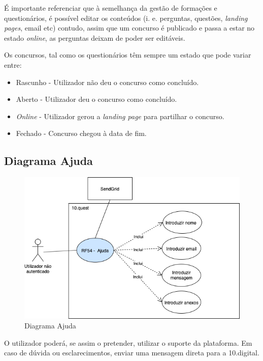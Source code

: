 É importante referenciar que à semelhança da gestão de formações e questionários, é possível editar os conteúdos (i. e. perguntas, questões, \textit{landing pages}, email etc) contudo, assim que um concurso é publicado e passa a estar no estado \textit{online}, as perguntas deixam de poder ser editáveis. 

Os concursos, tal como os questionários têm sempre um estado que pode variar entre:
\begin{itemize}
	\item Rascunho - Utilizador não deu o concurso como concluído.
	\item Aberto - Utilizador deu o concurso como concluído.
	\item \textit{Online} - Utilizador gerou a \textit{landing page} para partilhar o concurso.
	\item Fechado - Concurso chegou à data de fim.
\end{itemize}


\subsection{Diagrama Ajuda}
\label{d:ajuda}
\begin{figure}[ht!]
	\begin{center}
		\includegraphics[width=1\textwidth]{img/rf/ajuda}
		\caption{Diagrama Ajuda}
		\label{fig:rf-ajuda}
	\end{center}
\end{figure}


O utilizador poderá, se assim o pretender, utilizar o suporte da plataforma. Em caso de dúvida ou esclarecimentos, enviar uma mensagem direta para a 10.digital. 

